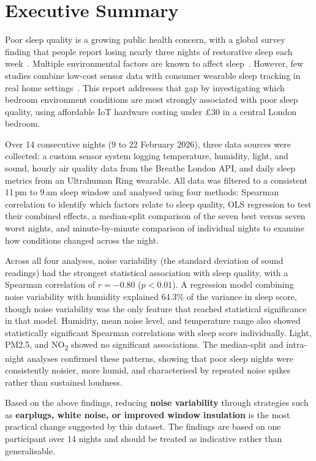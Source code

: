 \documentclass[10pt,a4paper]{extarticle}
\begin{document}
\section*{Executive Summary}
Poor sleep quality is a growing public health concern, with a global survey finding that people report losing nearly three nights of restorative sleep each week~\citep{resmed2025}. Multiple environmental factors are known to affect sleep~\citep{caddick2018,yasmeen2025}. However, few studies combine low-cost sensor data with consumer wearable sleep tracking in real home settings~\citep{basner2023}. This report addresses that gap by investigating which bedroom environment conditions are most strongly associated with poor sleep quality, using affordable IoT hardware costing under \pounds30 in a central London bedroom.

Over 14 consecutive nights (9 to 22 February 2026), three data sources were collected: a custom sensor system logging temperature, humidity, light, and sound, hourly air quality data from the Breathe London API, and daily sleep metrics from an Ultrahuman Ring wearable. All data was filtered to a consistent 11\,pm to 9\,am sleep window and analysed using four methods: Spearman correlation to identify which factors relate to sleep quality, OLS regression to test their combined effects, a median-split comparison of the seven best versus seven worst nights, and minute-by-minute comparison of individual nights to examine how conditions changed across the night.

Across all four analyses, noise variability (the standard deviation of sound readings) had the strongest statistical association with sleep quality, with a Spearman correlation of $r = -0.80$ ($p < 0.01$). A regression model combining noise variability with humidity explained 64.3\% of the variance in sleep score, though noise variability was the only feature that reached statistical significance in that model. Humidity, mean noise level, and temperature range also showed statistically significant Spearman correlations with sleep score individually. Light, PM2.5, and NO\textsubscript{2} showed no significant associations. The median-split and intra-night analyses confirmed these patterns, showing that poor sleep nights were consistently noisier, more humid, and characterised by repeated noise spikes rather than sustained loudness.

\begin{tcolorbox}[
  colback=imperialblue!5,
  colframe=imperialblue,
  leftrule=3pt,
  rightrule=0pt,
  toprule=0pt,
  bottomrule=0pt,
  boxsep=4pt,
  left=8pt,
  right=8pt,
  sharp corners
]
Based on the above findings, reducing \textbf{noise variability} through strategies such as \textbf{earplugs, white noise, or improved window insulation} is the most practical change suggested by this dataset. The findings are based on one participant over 14 nights and should be treated as indicative rather than generalisable.
\end{tcolorbox}
\end{document}
